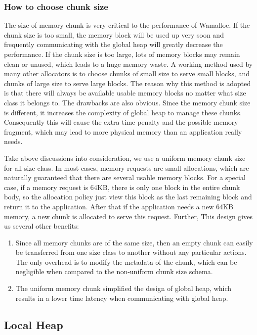 \documentclass[10pt, conference, compsocconf]{IEEEtran}
\begin{document}
\subsubsection{How to choose chunk size}
The size of memory chunk is very critical to the performance of Wamalloc. 
If the chunk size is too small, the memory block will be used up very soon and frequently communicating with the global heap will greatly decrease the performance.
If the chunk size is too large, lots of memory blocks may remain clean or unused, which leads to a huge memory waste. 
A working method used by many other allocators is to choose chunks of small size to serve small blocks, and chunks of large size to serve large blocks.
The reason why this method is adopted is that there will always be available usable memory blocks no matter what size class it belongs to.
The drawbacks are also obvious.
Since the memory chunk size is different, it increases the complexity of global heap to manage these chunks.
Consequently this will cause the extra time penalty and the possible memory fragment, which may lead to more physical memory than an application really needs.

Take above discussions into consideration, we use a uniform memory chunk size for all size class. 
In most cases, memory requests are small allocations, which are naturally guaranteed that there are several usable memory blocks. 
For a special case, if a memory request is 64KB, there is only one block in the entire chunk body, so the allocation policy just view this block as the last remaining block 
and return it to the application. 
After that if the application needs a new 64KB memory, a new chunk is allocated to serve this request.
Further, This design gives us several other benefits: 
\begin{enumerate}
    \item Since all memory chunks are of the same size, then an empty chunk can easily be transferred from one size class to another without any particular actions.
The only overhead is to modify the metadata of the chunk, which can be negligible when compared to the non-uniform chunk size schema. 
    \item The uniform memory chunk simplified the design of global heap, which results in a lower time latency when communicating with global heap.
\end{enumerate}

\subsection{Local Heap}
\end{document}
